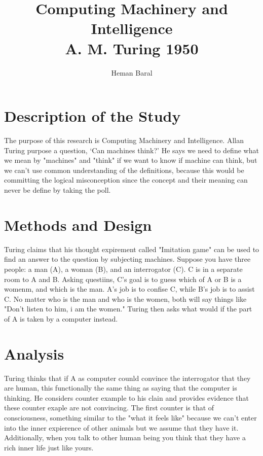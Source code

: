 \documentclass[journal, a4paper]{IEEEtran}
\begin{document}
	\title{Computing Machinery and Intelligence\\A. M. Turing 1950}
	\author{Heman Baral}{}
	\maketitle
\section{Description of the Study} 

	The purpose of this research is Computing Machinery and Intelligence. Allan Turing purpose a question, ‘Can machines think?’ He says we need to define what we mean by "machines" and "think" if we want to know if machine can think, but we can't use common understanding of the definitions, because this would be committing the logical misconception since the concept and their meaning can never be define by taking the poll. 


\section{Methods and Design}
	Turing claims that his thought expirement called "Imitation game" can be used to find an answer to the question by subjecting machines. 
Suppose you have three people: a man (A), a woman (B), and an interrogator (C). C is in a separate room to A and B. Asking questiins, C's goal is to guess which of A or B is a womenm, and which is the man. A's job is to confise C, while B's job is to assist C. No matter who is the man and who is the women, both will say things like "Don't listen to him, i am the women."
Turing then asks what would if the part of A is taken by a computer instead.


\section{Analysis}
	Turing thinks that if A as computer counld convince the interrogator that they are human, this functionally the same thing as saying that the computer is thinking. He considers counter example to his clain and provides evidence that these counter exaple are not convincing. The first counter is that of consciousness, something similar to the "what it feels like" because we can't enter into the inner expierence of other animals but we assume that they have it. Additionally, when you talk to other human being you think that they have a rich inner life just like yours. 
\end{document}
